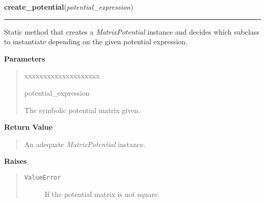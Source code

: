 \hspace{.8\funcindent}\begin{boxedminipage}{\funcwidth}

    \raggedright \textbf{create\_potential}(\textit{potential\_expression})

    \vspace{-1.5ex}

    \rule{\textwidth}{0.5\fboxrule}
\setlength{\parskip}{2ex}
    Static method that creates a \textit{MatrixPotential} instance and
    decides which subclass to instantiate depending on the given potential
    expression.

\setlength{\parskip}{1ex}
      \textbf{Parameters}
      \vspace{-1ex}

      \begin{quote}
        \begin{Ventry}{xxxxxxxxxxxxxxxxxxxx}

          \item[potential\_expression]

          The symbolic potential matrix given.

        \end{Ventry}

      \end{quote}

      \textbf{Return Value}
    \vspace{-1ex}

      \begin{quote}
      An adequate \textit{MatrixPotential} instance.

      \end{quote}

      \textbf{Raises}
    \vspace{-1ex}

      \begin{quote}
        \begin{description}

          \item[\texttt{ValueError}]

          If the potential matrix is not square.

        \end{description}

      \end{quote}

    \end{boxedminipage}

